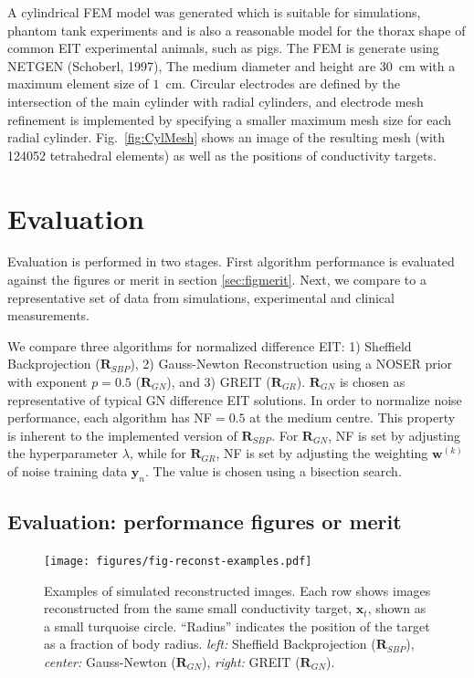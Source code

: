 \documentclass[12pt]{iopart}
\newcommand{\xB}{\mbox{$\mathbf{x}$}}
\newcommand{\yB}{\mbox{$\mathbf{y}$}}
\newcommand{\wB}{\mbox{$\mathbf{w}$}}
\newcommand{\RB}{\mbox{$\mathbf{R}$}}
\begin{document}
A cylindrical FEM model was generated which is suitable for
simulations, phantom tank experiments and is also a reasonable
model for the thorax shape of common EIT experimental animals,
such as pigs.  The FEM is generate using NETGEN (Schoberl, 1997),
The medium diameter
and height are $30$~cm with a maximum element size of $1$~cm.
Circular electrodes are defined by the intersection of the 
main cylinder with radial cylinders, and
electrode mesh refinement is implemented by specifying a
smaller maximum mesh size for each radial cylinder.
Fig.\ \ref{fig:CylMesh} shows an image of the resulting
mesh (with 124052 tetrahedral elements) as well as the positions
of conductivity targets.



\section{Evaluation}

Evaluation is performed in two stages. First algorithm performance
is evaluated against the figures or merit in section
\ref{sec:figmerit}.
Next, we compare to a representative set of data
from simulations, experimental and clinical measurements.

We compare three algorithms for normalized
difference EIT:
1) Sheffield Backprojection
    ($\RB_{SBP}$), 
2) Gauss-Newton Reconstruction using a
   NOSER prior with exponent $p=0.5$
    ($\RB_{GN}$), 
and
3) GREIT ($\RB_{GR}$). 
$\RB_{GN}$ is chosen as representative
of typical GN difference EIT solutions.
 In order to normalize
noise performance, each algorithm has
NF$=0.5$ at the medium centre. This property
is inherent to the implemented version
of $\RB_{SBP}$. 
For $\RB_{GN}$, NF is set by 
adjusting the hyperparameter $\lambda$, while
for $\RB_{GR}$, NF is set by 
adjusting the weighting $\wB^{(k)}$ of noise
training data $\yB_n$. The value is chosen using
a bisection search.


\subsection{Evaluation: performance figures or merit}
\label{sec:perffigm}

\begin{figure}[bhtp]
\begin{center}
\texttt{[image: figures/fig-reconst-examples.pdf]}
\caption{
\label{fig:FoMimages}
Examples of simulated reconstructed images. Each row
shows images reconstructed from the same small 
conductivity target, $\xB_t$, shown as 
a small turquoise circle. ``Radius'' indicates
the position of the target as a fraction of body radius.
{\em left:} Sheffield Backprojection ($\RB_{SBP}$),
{\em center:} Gauss-Newton ($\RB_{GN}$),
{\em right:} GREIT ($\RB_{GN}$).
}
\end{center}
\end{figure}
\end{document}
